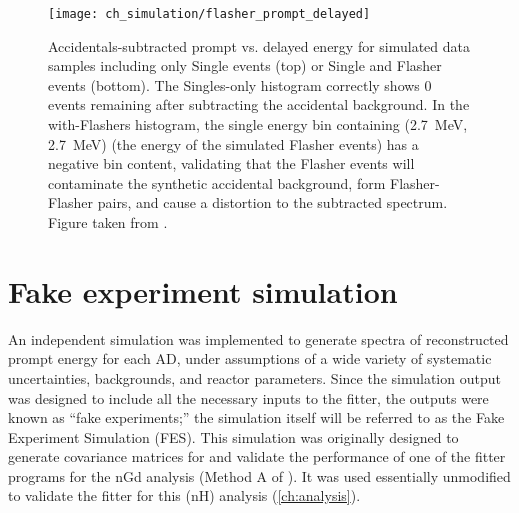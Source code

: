 \begin{figure}
    \centering
    \texttt{[image: ch\_simulation/flasher\_prompt\_delayed]}
    \caption[Simulated residual flashers impact]{
        Accidentals-subtracted prompt vs. delayed energy for simulated data samples
        including only Single events (top) or Single and Flasher events (bottom).
        The Singles-only histogram correctly shows 0 events remaining
        after subtracting the accidental background.
        In the with-Flashers histogram,
        the single energy bin containing (\SI{2.7}{\MeV}, \SI{2.7}{\MeV})
        (the energy of the simulated Flasher events)
        has a negative bin content,
        validating that the Flasher events
        will contaminate the synthetic accidental background,
        form Flasher-Flasher pairs, and cause a distortion to the subtracted spectrum.
        Figure taken from \cite{flasher_sim}.
    }
    \label{fig:sim_flasher_prompt_delayed}
\end{figure}

\section{Fake experiment simulation}
\label{sec:lbnl_toymc}

An independent simulation was implemented
to generate spectra of reconstructed prompt energy for each AD,
under assumptions of a wide variety of systematic uncertainties,
backgrounds, and reactor parameters.
Since the simulation output was designed to include all the necessary inputs
to the \thetaot{} fitter,
the outputs were known as ``fake experiments;''
the simulation itself will be referred to as the Fake Experiment Simulation (FES).
This simulation was originally \cite{lbnl_toymc,p12e_fitter,p14a_fitter} designed to generate covariance matrices for
and validate the performance of
one of the fitter programs for the nGd analysis
(Method A of \cite{ngd2016}).
It was used essentially unmodified to validate the fitter for this (nH) analysis
(\cref{ch:analysis}).

